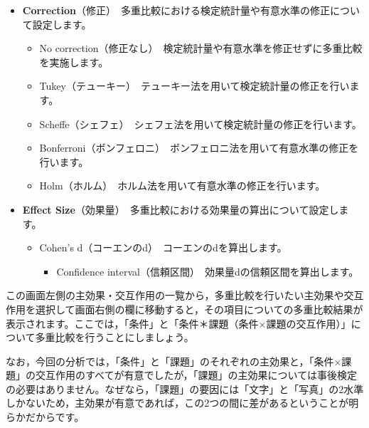 \documentclass[
  12pt,
  a5jpaper,
  lualatex, ja=standard]{bxjsbook}
\providecommand{\tightlist}{%
  \setlength{\itemsep}{0pt}\setlength{\parskip}{0pt}}
\newenvironment{jmvsettings}{%
	\begin{center}%
	\begin{tcolorbox}[%
		title=設定項目,
		colframe=gmoji,
		colbacktitle=gmoji,
		colback=gmoji!2!white,
		breakable,
		width=.9\textwidth,
		]\small\addtolength{\leftmargini}{-3\labelsep}%
	}%
	{\end{tcolorbox}\end{center}}
\begin{document}
\begin{jmvsettings}

\begin{itemize}
\tightlist
\item
  \textbf{Correction}（修正）　多重比較における検定統計量や有意水準の修正について設定します。

  \begin{itemize}
  \tightlist
  \item
    No correction（修正なし）　検定統計量や有意水準を修正せずに多重比較を実施します。
  \item
    Tukey（テューキー）　テューキー法を用いて検定統計量の修正を行います。
  \item
    Scheffe（シェフェ）　シェフェ法を用いて検定統計量の修正を行います。
  \item
    Bonferroni（ボンフェロニ）　ボンフェロニ法を用いて有意水準の修正を行います。
  \item
    Holm（ホルム）　ホルム法を用いて有意水準の修正を行います。
  \end{itemize}
\item
  \textbf{Effect Size}（効果量）　多重比較における効果量の算出について設定します。

  \begin{itemize}
  \tightlist
  \item
    Cohen's d（コーエンのd）　コーエンのdを算出します。

    \begin{itemize}
    \tightlist
    \item
      Confidence interval（信頼区間）　効果量dの信頼区間を算出します。
    \end{itemize}
  \end{itemize}
\end{itemize}

\end{jmvsettings}

この画面左側の主効果・交互作用の一覧から，多重比較を行いたい主効果や交互作用を選択して画面右側の欄に移動すると，その項目についての多重比較結果が表示されます。ここでは，「条件」と「条件＊課題（条件×課題の交互作用）」について多重比較を行うことにしましょう。

なお，今回の分析では，「条件」と「課題」のそれぞれの主効果と，「条件×課題」の交互作用のすべてが有意でしたが，「課題」の主効果については事後検定の必要はありません。なぜなら，「課題」の要因には「文字」と「写真」の2水準しかないため，主効果が有意であれば，この2つの間に差があるということが明らかだからです。
\end{document}
